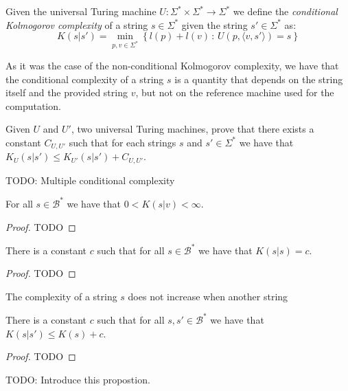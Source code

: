 \begin{definition}
Given the universal Turing machine $U:\Sigma^{\ast}\times\Sigma^{\ast}\rightarrow\Sigma^{\ast}$ we define the \emph{conditional Kolmogorov complexity} of a string $s\in\Sigma^{\ast}$ given the string $s'\in\Sigma^{\ast}$ as:
\[
K(s|s')=\min_{p,v\in\Sigma^{\ast}}\left\{l(p) + l(v)\,:\, U(p,\langle v, s' \rangle)=s\right\}
\]
\end{definition}

As it was the case of the non-conditional Kolmogorov complexity, we have that the conditional complexity of a string $s$ is a quantity that depends on the string itself and the provided string $v$, but not on the reference machine used for the computation.

\begin{exercise}
Given $U$ and $U'$, two universal Turing machines, prove that there exists a constant $C_{U, U'}$ such that for each strings $s$ and $s' \in \Sigma^{\ast}$ we have that $K_{U}(s|s') \leq K_{U'}(s|s') + C_{U, U'}$.
\end{exercise}

{\color{red} TODO: Multiple conditional complexity}

\begin{proposition}
For all $s\in\mathcal{B}^{\ast}$ we have that $0 < K(s | v) < \infty$.
\end{proposition}
\begin{proof}
{\color{red} TODO}
\end{proof}


\begin{proposition}
There is a constant $c$ such that for all $s\in\mathcal{B}^{\ast}$ we have that $K(s | s ) = c$.
\end{proposition}
\begin{proof}
{\color{red} TODO}
\end{proof}

The complexity of a string $s$ does not increase when another string

\begin{proposition}
\label{prop:kolmogorov_conditional}
There is a constant $c$ such that for all $s, s'\in\mathcal{B}^{\ast}$ we have that $K(s | s' ) \leq K(s) + c$.
\end{proposition}
\begin{proof}
{\color{red} TODO}
\end{proof}

{\color{red} TODO: Introduce this propostion.}


